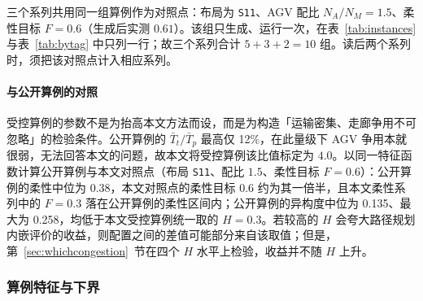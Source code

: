 \documentclass[manuscript,screen,review]{acmart}
\newcommand{\NCases}{10}
\newcommand{\PubFMed}{0.38}              %
\newcommand{\PubHMed}{0.135}             %
\newcommand{\PubHMax}{0.258}             %
\newcommand{\PubTtTpHi}{12\%}            %
\begin{document}
三个系列共用同一组算例作为对照点：布局为 \texttt{S11}、AGV 配比 $N_A/N_M=1.5$、柔性目标 $F=0.6$（生成后实测 $0.61$）。该组只生成、运行一次，在表~\ref{tab:instances} 与表~\ref{tab:bytag} 中只列一行；故三个系列合计 $5+3+2=\NCases$ 组。读后两个系列时，须把该对照点计入相应系列。

\paragraph{与公开算例的对照}
受控算例的参数不是为抬高本文方法而设，而是为构造「运输密集、走廊争用不可忽略」的检验条件。公开算例的 $\bar{T}_t/\bar{T}_p$ 最高仅 \PubTtTpHi{}，在此量级下 AGV 争用本就很弱，无法回答本文的问题，故本文将受控算例该比值标定为 $4.0$。以同一特征函数计算公开算例与本文对照点（布局 \texttt{S11}、配比 $1.5$、柔性目标 $F=0.6$）：公开算例的柔性中位为 \PubFMed{}，本文对照点的柔性目标 $0.6$ 约为其一倍半，且本文柔性系列中的 $F=0.3$ 落在公开算例的柔性区间内；公开算例的异构度中位为 \PubHMed{}、最大为 \PubHMax{}，均低于本文受控算例统一取的 $H=0.3$。若较高的 $H$ 会夸大路径规划内嵌评价的收益，则配置之间的差值可能部分来自该取值；但是，第~\ref{sec:whichcongestion}~节在四个 $H$ 水平上检验，收益并不随 $H$ 上升。

\begin{table}[t]
\caption{受控算例。全部算例共用 $12$ 工件、$36$ 道加工工序、$8$ 台加工机器、$H=0.3$、
$\bar{T}_t/\bar{T}_p\approx4.0$；三个系列分别只变化布局、AGV 配比与柔性。争用强度为初始随机种群
上让行时间占行驶总时间的比例，由算例结构决定，不是输入参数。}
\label{tab:instances}
\small

\end{table}

\subsubsection{算例特征与下界}
\label{sec:features}
\end{document}
